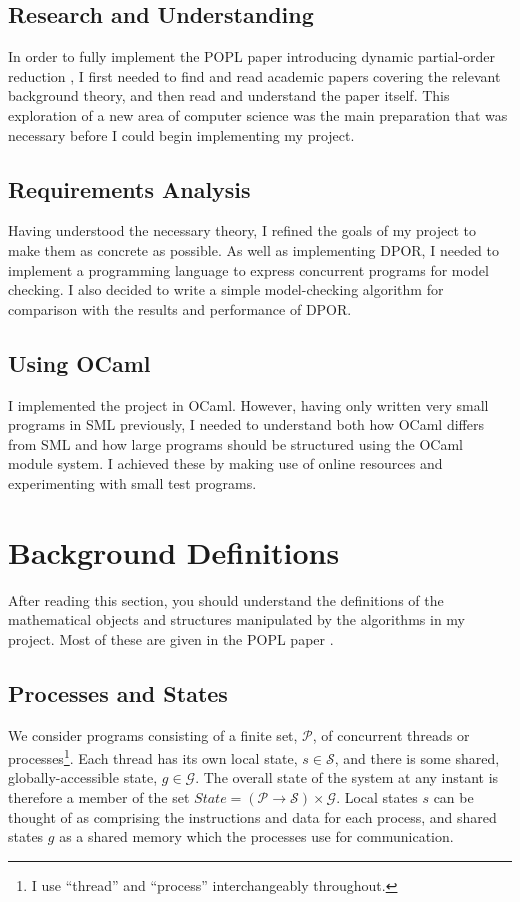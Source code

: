 \documentclass[12pt,a4paper,twoside,openright]{report}
\begin{document}
\subsection{Research and Understanding}

In order to fully implement the
POPL paper introducing dynamic partial-order
reduction \cite{flan05}, I first needed
to find and read academic papers
covering the relevant
background theory, and then
read and understand the paper itself.
This exploration
of a new area of computer science was the
main preparation that was necessary
before I could begin implementing
my project.

\subsection{Requirements Analysis}
Having understood the necessary theory,
I refined the goals of my project to
make them as concrete as possible.
As well as implementing DPOR,
I needed to implement
a programming language
to express concurrent programs
for model checking. I also decided
to write a simple model-checking
algorithm for comparison with
the results and performance of DPOR.

\subsection{Using OCaml}
I implemented the project in OCaml.
However, having only written very small
programs in SML previously, I needed to
understand both how OCaml differs from SML
and how large programs
should be structured
using the OCaml module system.
I achieved these
by making use of online resources and
experimenting with small test programs.

\section{Background Definitions} \label{sec:background-defs}
After reading this section, you should understand the
definitions of the mathematical objects and structures
manipulated by the algorithms in my project. Most
of these are given in the POPL paper \cite{flan05}.

\subsection{Processes and States}
We consider programs consisting of a finite set, $\mathcal{P}$,
of concurrent threads or processes\footnote{I use ``thread'' and
``process'' interchangeably throughout.}.
Each thread has its own local state, $s \in \mathcal{S}$, and there
is some shared, globally-accessible state, $g \in \mathcal{G}$. The overall
state of the system at any instant is therefore a member of the set
$ \textit{State} = (\mathcal{P} \to \mathcal{S}) \times \mathcal{G} $.
Local states $s$ can be thought of as comprising the instructions
and data for each process, and shared states $g$
as a shared memory which the processes use for communication.
\end{document}
